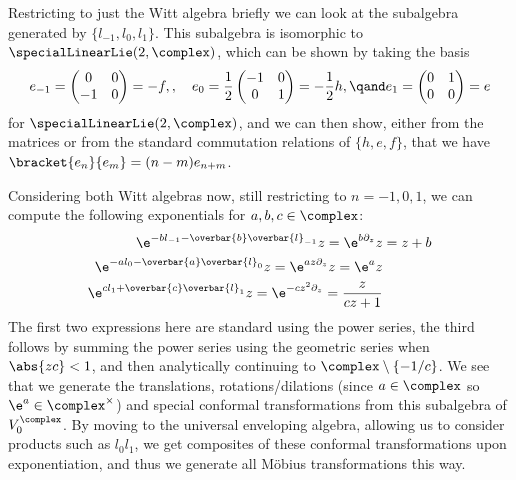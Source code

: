 \documentclass[fleqn]{NotesClass}
\begin{document}
    Restricting to just the Witt algebra briefly we can look at the subalgebra generated by \(\{l_{-1}, l_0, l_1\}\).
    This subalgebra is isomorphic to \(\specialLinearLie(2, \complex)\), which can be shown by taking the basis
    \begin{equation}
        e_{-1} = 
        \begin{pmatrix}
            0 & 0\\
            -1 & 0
        \end{pmatrix}
        = -f, 
        , \quad e_0 = \frac{1}{2}
        \begin{pmatrix}
            -1 & 0\\
            0 & 1
        \end{pmatrix}
        = -\frac{1}{2}h, \qand e_1 = 
        \begin{pmatrix}
            0 & 1\\
            0 & 0
        \end{pmatrix}
        = e
    \end{equation}
    for \(\specialLinearLie(2, \complex)\), and we can then show, either from the matrices or from the standard commutation relations of \(\{h, e, f\}\), that we have \(\bracket{e_n}{e_m} = (n - m)e_{n + m}\).
    
    Considering both Witt algebras now, still restricting to \(n = -1, 0, 1\), we can compute the following exponentials for \(a, b, c \in \complex\):
    \begin{align}
        \e^{-bl_{-1} - \overbar{b}\overbar{l}_{-1}}z = \e^{b \partial_z}z &= z + b\\
        \e^{-al_0 - \overbar{a}\overbar{l}_0}z = \e^{az\partial_z}z = \e^az\\
        \e^{cl_1 + \overbar{c}\overbar{l}_1}z = \e^{-cz^2\partial_z} = \frac{z}{cz + 1}
    \end{align}
    The first two expressions here are standard using the power series, the third follows by summing the power series using the geometric series when \(\abs{zc} < 1\), and then analytically continuing to \(\complex \setminus \{-1/c\}\).
    We see that we generate the translations, rotations/dilations (since \(a \in \complex\) so \(\e^a \in \complex^{\times}\)) and special conformal transformations from this subalgebra of \(V_0^{\complex}\).
    By moving to the universal enveloping algebra, allowing us to consider products such as \(l_0l_1\), we get composites of these conformal transformations upon exponentiation, and thus we generate all M\"obius transformations this way.
    
\end{document}
